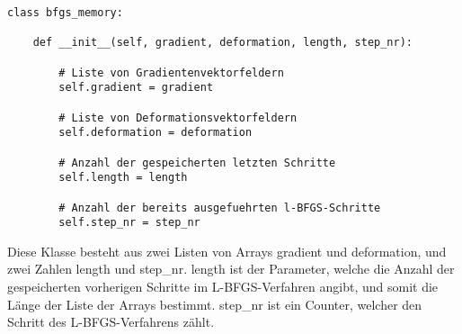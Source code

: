 \begin{lstlisting}
class bfgs_memory:

    def __init__(self, gradient, deformation, length, step_nr):

        # Liste von Gradientenvektorfeldern
        self.gradient = gradient

        # Liste von Deformationsvektorfeldern
        self.deformation = deformation

        # Anzahl der gespeicherten letzten Schritte
        self.length = length

        # Anzahl der bereits ausgefuehrten l-BFGS-Schritte
        self.step_nr = step_nr
\end{lstlisting}

Diese Klasse besteht aus zwei Listen von Arrays \textsf{gradient} und \textsf{deformation}, und zwei Zahlen \textsf{length} und \textsf{step\_nr}. 
\textsf{length} ist der Parameter, welche die Anzahl der gespeicherten vorherigen Schritte im L-BFGS-Verfahren angibt, und somit die Länge der Liste der Arrays bestimmt. \textsf{step\_nr} ist ein Counter, welcher den Schritt des L-BFGS-Verfahrens zählt. 

